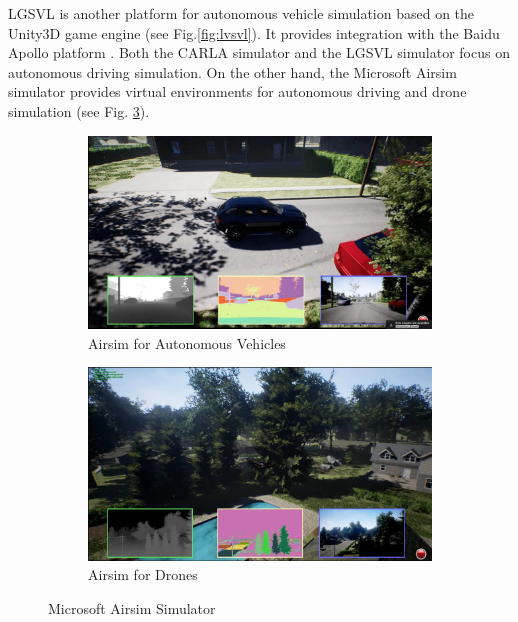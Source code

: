  LGSVL is another platform for autonomous vehicle simulation based on the Unity3D game engine (see Fig.\ref{fig:lvsvl}). It provides integration with the Baidu Apollo platform \citep{rong2020lgsvl}. Both the CARLA simulator and the LGSVL simulator focus on autonomous driving simulation. On the other hand, the Microsoft Airsim simulator provides virtual environments for autonomous driving and drone simulation \citep{airsim2017fsr} (see Fig. \ref{fig.airsim}).

\begin{figure}[H]
\centering
\begin{subfigure}[b]{0.49\textwidth}
    \centering
    \includegraphics[width=\textwidth]{figures/chapter_intro/airsim_car.jpg}
    \caption{Airsim for Autonomous Vehicles}
    \label{fig:airsim_car}
\end{subfigure}
\hfill
\begin{subfigure}[b]{0.49\textwidth}
    \centering
    \includegraphics[width=\textwidth]{figures/chapter_intro/airsim_drone.jpg}
    \caption{Airsim for Drones}
    \label{fig:airsim_drone}
\end{subfigure}
\hfill
\caption{Microsoft Airsim Simulator \citep{airsim2017fsr}}
\label{fig.airsim}
\end{figure}


